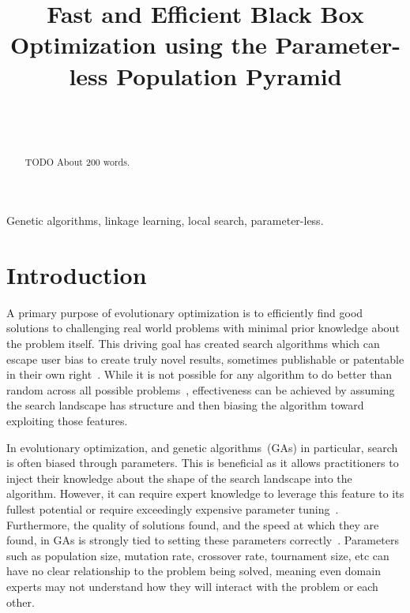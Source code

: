 \documentclass[twoside]{article}
\begin{document}
\title{\bf Fast and Efficient Black Box Optimization using the Parameter-less Population Pyramid}  

\author{ \hfill {}\\ 
\AND
        \hfill {}\\
}

\maketitle

\begin{abstract}

TODO About 200 words.

\end{abstract}

\begin{keywords}

Genetic algorithms, 
linkage learning,
local search,
parameter-less.

\end{keywords}

\section{Introduction}
A primary purpose of evolutionary optimization is to efficiently find good solutions
to challenging real world problems with minimal prior knowledge about the problem itself.
This driving goal has created search algorithms which can escape user bias to create
truly novel results, sometimes publishable or patentable in their own right~\citep{kannappan:2014:humies}.
While it is not possible for any algorithm to do better than random across all possible
problems~\citep{Wolpert:1997:nfl}, effectiveness can be achieved by assuming the search
landscape has structure and then biasing the algorithm toward exploiting those features.

In evolutionary optimization, and genetic algorithms~(GAs) in particular, search is often
biased through parameters. This is beneficial as it allows practitioners to inject their
knowledge about the shape of the search landscape into the algorithm. However, it can require
expert knowledge to leverage this feature to its fullest potential or require exceedingly expensive
parameter tuning~\citep{grefenstette:1986:optimalga}. Furthermore, the quality of solutions found,
and the speed at which they are found, in GAs is strongly tied to setting these parameters
correctly~\citep{goldberg:1991:gasize}. Parameters such as population size, mutation rate, crossover
rate, tournament size, etc can have no clear relationship to the problem being solved, meaning even
domain experts may not understand how they will interact with the problem or each other.
\end{document}

